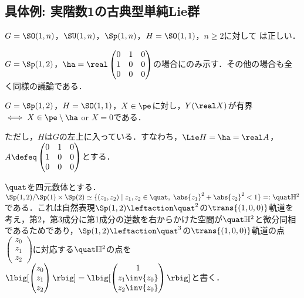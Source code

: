 \subsection{具体例: 実階数1の古典型単純Lie群}
\begin{prop}\label{prop:classical-rank-one}
  $G = \SO(1,n)$，$ \SU(1, n)$，$\Sp(1,n) $，$H = \SO(1,1) $，$n\geq 2$に対して は正しい．
\end{prop}

$G = \Sp(1,2) $，$\ha = \real \begin{pmatrix}
    0 & 1 & 0 \\
    1 & 0 & 0\\
    0 & 0 & 0
  \end{pmatrix}$の場合にのみ示す．その他の場合も全く同様の議論である．
\begin{prop}\label{prop:1127-main}
  $G = \Sp(1,2) $，$H = \SO(1,1)$，$X\in \pe$に対し，$Y(\real X) $が有界$\iff X\in \pe\setminus \ha  $ or $X = 0$である．
\end{prop}

ただし，$H$は$G$の左上に入っている．すなわち，$\Lie H = \ha = \real A $，$A\defeq \begin{pmatrix}
  0 & 1 & 0 \\
  1 & 0 & 0\\
  0 & 0 & 0
\end{pmatrix}$とする．

\begin{nttdef}
  
  $\quat$を四元数体とする．$\Sp(1,2)/\Sp(1)\times \Sp(2) \simeq \{(z_1, z_2)\mid z_1,z_2\in \quat ,\; \abs{z_1}^2 + \abs{z_2}^2   < 1 \} =: \quat\mathbb{H}^2 $である．これは自然表現$\Sp(1,2)\leftaction \quat^2 $の$\trans{(1,0,0)} $軌道を考え，第2，第3成分に第1成分の逆数を右からかけた空間が$\quat\mathbb{H}^2$と微分同相であるためであり，$\Sp(1,2)\leftaction \quat^3 $の$\trans{(1,0,0)} $軌道の点$
  \begin{pmatrix}
    z_0 \\ z_1 \\ z_2 
  \end{pmatrix}
  $に対応する$\quat\mathbb{H}^2$の点を$
  \lbig[ \begin{pmatrix}
    z_0 \\ z_1 \\ z_2 
  \end{pmatrix}\rbig] = \lbig[ \begin{pmatrix}
    1 \\ z_1\inv{z_0} \\ z_2\inv{z_0} 
  \end{pmatrix}\rbig] 
  $と書く．
\end{nttdef}

